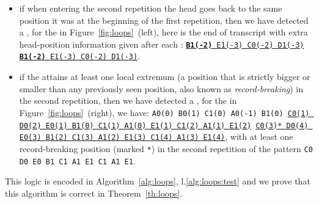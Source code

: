 \begin{itemize}
  \item if when entering the second repetition the head goes back to the same position it was at the beginning of the first repetition, then we have detected a \cycler, \eg for the \cycler in Figure~\ref{fig:loops}~(left), here is the end of transcript with extra head-position information given after each \ssp: \texttt{\underline{\textbf{B1(-2)} E1(-3) C0(-2) D1(-3)} \underline{\textbf{B1(-2)} E1(-3) C0(-2) D1(-3)}}.

  \item if the \headpos attains at least one local extremum (\ie a position that is strictly bigger or smaller than any previously seen position, also known as \textit{record-breaking}) in the second repetition, then we have detected a \TC, \eg for the \TC in Figure~\ref{fig:loops}~(right), we have: \texttt{A0(0) B0(1) C1(0) A0(-1) B1(0) \underline{C0(1) D0(2) E0(1) B1(0) C1(1) A1(0) E1(1) C1(2) A1(1) E1(2)} \underline{C0(3)* D0(4) E0(3) B1(2) C1(3) A1(2) E1(3) C1(4) A1(3) E1(4)}}, with at least one record-breaking position (marked \texttt{*}) in the second repetition of the \ssp pattern \texttt{C0 D0 E0 B1 C1 A1 E1 C1 A1 E1}.

\end{itemize}

This logic is encoded in Algorithm~\ref{alg:loops}, l.\ref{alg:loops:test} and we prove that this algorithm is correct in Theorem~\ref{th:loops}.

